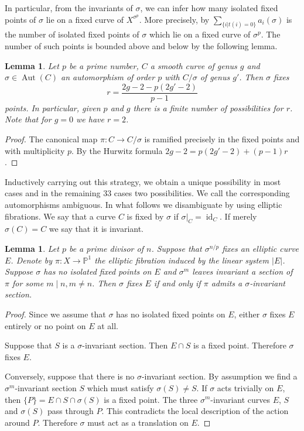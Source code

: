 \documentclass[a4paper]{amsart}
\theoremstyle{definition}
\theoremstyle{plain}
\newtheorem{lemma}[definition]{Lemma}
\DeclareMathOperator{\id}{id}
\DeclareMathOperator{\Aut}{Aut}
\newcommand{\PP}{\mathbb{P}}
\begin{document}
In particular, from the invariants of $\sigma$, we can infer how many isolated fixed points of $\sigma$ lie on a fixed curve of $X^{\sigma^p}$. More precisely, by  $\sum_{\{i|t(i)=0\}}a_i(\sigma)$ is the number of isolated fixed points of $\sigma$ which lie on a fixed curve of $\sigma^p$.
The number of such points is bounded above and below by the following lemma.
\begin{lemma}
 Let $p$ be a prime number, $C$ a smooth curve of genus $g$ and $\sigma \in \Aut(C)$ an automorphism of order $p$ with $C/\sigma$ of genus $g'$. Then $\sigma$ fixes
 \[r = \frac{2g -2 - p(2g'-2)}{p-1}\]
 points. In particular, given $p$ and $g$ there is a finite number of possibilities for $r$.
 Note that for $g = 0$ we have $r = 2$.
\end{lemma}
\begin{proof}
 The canonical map $\pi\colon C \to C/\sigma$ is ramified precisely in the fixed points and with multiplicity $p$.
 By the Hurwitz formula $2g -2 = p (2 g' - 2) + (p-1)r$.
\end{proof}

Inductively carrying out this strategy, we obtain a unique possibility in most cases and in the remaining $33$ cases two possibilities. We call
the corresponding automorphisms ambiguous. In what follows we disambiguate by using elliptic fibrations.
We say that a curve $C$ is fixed by $\sigma$ if $\sigma|_C=\id_C$. If merely $\sigma(C)=C$ we say that it is invariant.
\begin{lemma}\label{lemma:sect}
 Let $p$ be a prime divisor of $n$. Suppose that $\sigma^{n/p}$ fixes an elliptic curve $E$. Denote by $\pi\colon X \to \PP^1$ the elliptic fibration induced by the linear system $|E|$.
 Suppose $\sigma$ has no isolated fixed points on $E$ and $\sigma^m$ leaves invariant a section of $\pi$ for some $m \mid n, m \neq n$.
 Then $\sigma$ fixes $E$ if and only if $\pi$ admits a $\sigma$-invariant section.
\end{lemma}
\begin{proof}
 Since we assume that $\sigma$ has no isolated fixed points on $E$,
 either $\sigma$ fixes $E$ entirely or no point on $E$ at all.

 Suppose that $S$ is a $\sigma$-invariant section. Then $E \cap S$ is a fixed point. Therefore $\sigma$ fixes $E$.

Conversely, suppose that there is no $\sigma$-invariant section. By assumption we find a $\sigma^m$-invariant section $S$ which must satisfy $\sigma(S) \neq S$.
If $\sigma$ acts trivially on $E$, then $\{P\}=E \cap S \cap \sigma(S)$ is a fixed point. The three $\sigma^m$-invariant curves $E$, $S$ and $\sigma(S)$ pass through $P$. This contradicts the local description of the action around $P$.  Therefore $\sigma$ must act as a translation on $E$.
\end{proof}
\end{document}
